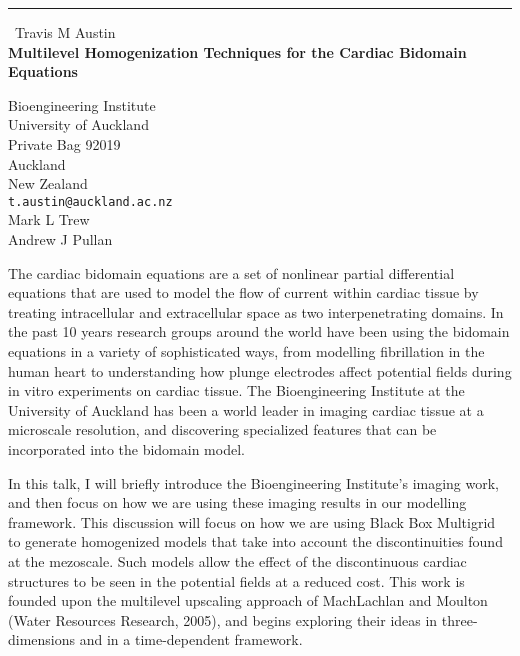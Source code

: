 \documentclass{report}
\begin{document}
\begin{center}
\rule{6in}{1pt} \
{\large Travis M Austin \\
{\bf Multilevel Homogenization Techniques for the Cardiac Bidomain Equations}}

Bioengineering Institute \\ University of Auckland \\ Private Bag 92019 \\ Auckland \\ New Zealand
\\
{\tt t.austin@auckland.ac.nz}\\
Mark L Trew\\
Andrew J Pullan\end{center}

The cardiac bidomain equations are a set of nonlinear partial
differential equations that are used to model the flow of current within
cardiac tissue by treating intracellular and extracellular space as two
interpenetrating domains. In the past 10 years research groups around the
world have been using the bidomain equations in a variety of
sophisticated ways, from modelling fibrillation in the human heart to
understanding how plunge electrodes affect potential fields during in
vitro experiments on cardiac tissue. The Bioengineering Institute at the
University of Auckland has been a world leader in imaging cardiac tissue
at a microscale resolution, and discovering specialized features that can
be incorporated into the bidomain model.

In this talk, I will briefly introduce the Bioengineering
Institute's imaging work, and then focus on how we are using these
imaging results in our modelling framework. This discussion will focus on
how we are using Black Box Multigrid to generate homogenized models that
take into account the discontinuities found at the mezoscale. Such models
allow the effect of the discontinuous cardiac structures to be seen in
the potential fields at a reduced cost. This work is founded upon the
multilevel upscaling approach of MachLachlan and Moulton (Water Resources
Research, 2005), and begins exploring their ideas in three-dimensions and
in a time-dependent framework.
\end{document}
